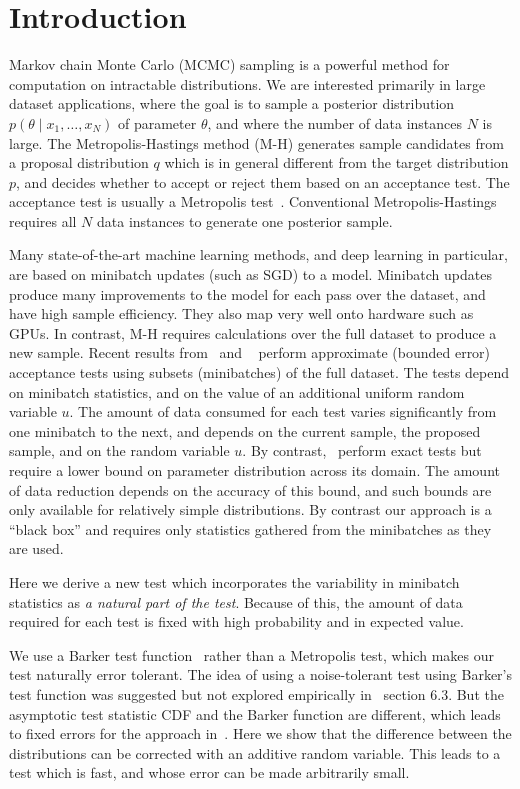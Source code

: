 \documentclass[twoside]{article} \usepackage{aistats2017}
\begin{document}
\section{Introduction}\label{sec:introduction}
Markov chain Monte Carlo (MCMC) sampling is a powerful method for
computation on intractable distributions. We are interested primarily
in large dataset applications, where the goal is to sample a posterior
distribution $p(\theta \mid x_1, \ldots, x_N)$ of parameter $\theta$,
and where the number of data instances $N$ is large.  The
Metropolis-Hastings method (M-H) generates sample candidates from a
proposal distribution $q$ which is in general different from the
target distribution $p$, and decides whether to accept or reject them
based on an acceptance test. The acceptance test is usually a
Metropolis test~\citep{Metropolis1953, hastings70}. Conventional
Metropolis-Hastings requires all $N$ data instances to generate one
posterior sample.

Many state-of-the-art machine learning methods, and deep learning in
particular, are based on minibatch updates (such as SGD) to a model.
Minibatch updates produce many improvements to the model for each pass
over the dataset, and have high sample efficiency. They also map very
well onto hardware such as GPUs. In contrast, M-H requires
calculations over the full dataset to produce a new sample.  Recent
results from~\citet{cutting_mh_2014} and ~\citet{icml2014c1_bardenet14} perform
approximate (bounded error) acceptance tests using subsets
(minibatches) of the full dataset. The tests depend on minibatch
statistics, and on the value of an additional uniform random variable
$u$. The amount of data consumed for each test varies significantly
from one minibatch to the next, and depends on the current sample, the
proposed sample, and on the random variable $u$. By
contrast,~\citet{conf/uai/MaclaurinA14,TallData15} perform exact
tests but require a lower bound on parameter distribution across its
domain.  The amount of data reduction depends on the accuracy of this
bound, and such bounds are only available for relatively simple
distributions. By contrast our approach is a ``black box'' and requires
only statistics gathered from the minibatches as they are used. 

Here we derive a new test which incorporates the variability in minibatch
statistics as {\em a natural part of the test}. Because of this, the amount of
data required for each test is fixed with high probability and in expected
value.

We use a Barker test function~\citep{Barker65} rather than a Metropolis
test, which makes our test naturally error tolerant. The idea of using
a noise-tolerant test using Barker's test function was suggested but
not explored empirically in~\citet{TallData15} section 6.3. But the
asymptotic test statistic CDF and the Barker function are different,
which leads to fixed errors for the approach
in~\citet{TallData15}. Here we show that the difference between the
distributions can be corrected with an additive random variable. This
leads to a test which is fast, and whose error can be made arbitrarily
small.
\end{document}
